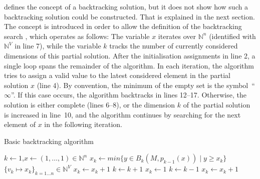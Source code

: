      defines the concept of a backtracking solution, but
    it does not show how such a backtracking solution could be constructed.
    That is explained in the next section.
    The concept is introduced in order to allow the definition of the
    backtracking search , which operates as follows:
    The variable $x$ iterates over $\mathbb N^n$
    (identified with $\mathbb N^V$ in line 7), while the variable $k$ tracks the
    number of currently considered dimensions of this partial solution.
    After the initialisation assignments in line 2, a single loop spans the
    remainder of the algorithm.
    In each iteration, the algorithm tries to assign a valid value to the latest
    considered element in the partial solution $x$ (line 4).
    By convention, the minimum of the empty set is the
    \mbox{symbol ``$\infty$''}.
    If this case occurs, the algorithm backtracks in lines 12--17.
    Otherwise, the solution is either complete (lines 6--8), or the dimension
    $k$ of the partial solution is increased in \mbox{line 10}, and the
    algorithm continues by searching for the next element of $x$ in the
    following iteration.

\begin{algorithm}[p]
    \caption{Basic backtracking algorithm}
    \begin{algorithmic}[1]
        \vspace{-0.45em}
            \State $k\gets1$,\quad$x\gets(1,\dots,1)\in\mathbb N^n$\vspace{-0.45em}
            \vspace{-0.45em}
                \State $x_k\gets min\{y\in B_k(M,p_{k-1}(x))\mid y\geq x_k\}$\vspace{-0.45em}
                \vspace{-0.45em}
                    \vspace{-0.45em}
                         $\{v_k\mapsto x_k\}_{k=1\dots n}\in\mathbb N^V$\vspace{-0.45em}
                        \State $x_k\gets x_k+1$\vspace{-0.45em}
                    \Else\vspace{-0.45em}
                        \State $k\gets k+1$\vspace{-0.45em}
                        \State $x_k\gets1$\vspace{-0.45em}
                    \EndIf
                \Else\vspace{-0.45em}
                    \State $k\gets k-1$\vspace{-0.45em}
                    \vspace{-0.45em}
                        \State$x_k\gets x_k+1$\vspace{-0.45em}
                    \Else\vspace{-0.45em}
                    \EndIf
                \EndIf
            \EndWhile
        \EndProcedure
    \end{algorithmic}
    \label{backtrackalg}
\end{algorithm}

